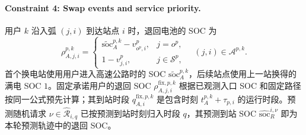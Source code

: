 \documentclass[12pt,a4paper,UTF8]{ctexart}
\begin{document}
\paragraph{Constraint 4: Swap events and service priority.}
用户 $k$ 沿入弧 $(j,i)$ 到达站点 $i$ 时，退回电池的 SOC 为
\begin{equation}
\rho_{A,j,i}^{p,k}
=
\begin{cases}
\widetilde{\mathrm{soc}}_{A}^{p,k}-v_{o^p,i}^{p},
&j=o^p,\\
1-v_{j,i}^{p},
&j\in\mathcal S^p,
\end{cases}
\quad (j,i)\in\mathcal A^{p,k}.
\label{eq:return_soc}
\end{equation}
首个换电站使用用户进入高速公路时的 SOC $\widetilde{\mathrm{soc}}_{A}^{p,k}$，后续站点使用上一站换得的满电 SOC $1$。固定承诺用户的退回 SOC
$\rho_{A,j,i}^{\mathrm{fix},p,k}$ 根据已观测入口 SOC 和固定路径按同一公式预先计算；其到站时段 $q_{A,i}^{\mathrm{fix},p,k}$ 是包含时刻 $t_A^{p,k}+\tau_{p,i}$ 的运行时段。预测随机请求
$\nu\in\widehat{\mathcal R}_{i,q}$ 已按预测到站时刻归入时段 $q$，其预测到站 SOC
$\widehat{\mathrm{soc}}_{R}^{i,\nu}$ 即为本轮预测轨迹中的退回 SOC。
\end{document}
